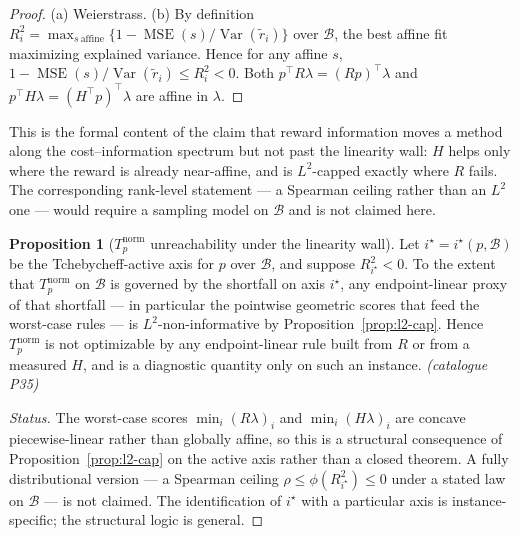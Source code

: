 \documentclass[12pt,a4paper]{report}
\newcommand{\1}{\mathbf{1}}
\newcommand{\Bset}{\mathcal{B}}
\DeclareMathOperator{\MSE}{MSE}
\DeclareMathOperator{\Var}{Var}
\theoremstyle{definition}
\newtheorem{proposition}[definition]{Proposition}
\begin{document}
\begin{proof}
(a) Weierstrass. (b) By definition \(R^2_i=\max_{s\ \text{affine}}\{1-\MSE(s)/\Var(\tilde r_i)\}\) over \(\Bset\), the best affine fit maximizing explained variance. Hence for any affine \(s\), \(1-\MSE(s)/\Var(\tilde r_i)\le R^2_i<0\). Both \(p^\top R\lambda=(Rp)^\top\lambda\) and \(p^\top H\lambda=(H^\top p)^\top\lambda\) are affine in \(\lambda\).
\end{proof}

This is the formal content of the claim that reward information moves a method along the cost--information spectrum but not past the linearity wall: \(H\) helps only where the reward is already near-affine, and is \(L^2\)-capped exactly where \(R\) fails. The corresponding rank-level statement --- a Spearman ceiling rather than an \(L^2\) one --- would require a sampling model on \(\Bset\) and is not claimed here.

\begin{proposition}[\(T_p^{\mathrm{norm}}\) unreachability under the linearity wall]
\label{prop:t-unreachable}
Let \(i^\star=i^\star(p,\Bset)\) be the Tchebycheff-active axis for \(p\) over \(\Bset\), and suppose \(R^2_{i^\star}<0\). To the extent that \(T_p^{\mathrm{norm}}\) on \(\Bset\) is governed by the shortfall on axis \(i^\star\), any endpoint-linear proxy of that shortfall --- in particular the pointwise geometric scores that feed the worst-case rules --- is \(L^2\)-non-informative by Proposition~\ref{prop:l2-cap}. Hence \(T_p^{\mathrm{norm}}\) is not optimizable by any endpoint-linear rule built from \(R\) or from a measured \(H\), and is a diagnostic quantity only on such an instance. \emph{(catalogue P35)}
\end{proposition}

\begin{proof}[Status]
The worst-case scores \(\min_i(R\lambda)_i\) and \(\min_i(H\lambda)_i\) are concave piecewise-linear rather than globally affine, so this is a structural consequence of Proposition~\ref{prop:l2-cap} on the active axis rather than a closed theorem. A fully distributional version --- a Spearman ceiling \(\rho\le\phi(R^2_{i^\star})\le0\) under a stated law on \(\Bset\) --- is not claimed. The identification of \(i^\star\) with a particular axis is instance-specific; the structural logic is general.
\end{proof}
\end{document}
